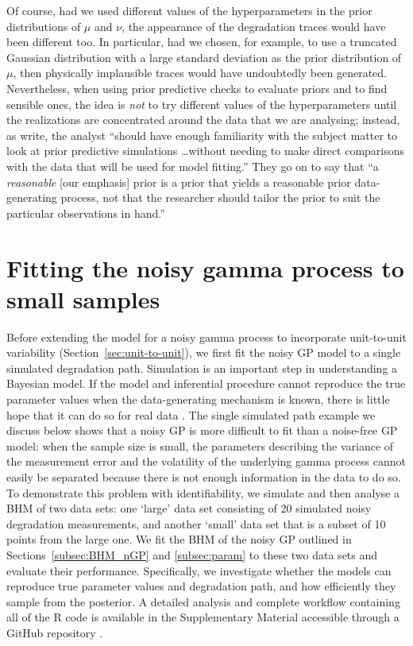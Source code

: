 \documentclass{article}
\begin{document}
Of course, had we used different values of the hyperparameters in the prior distributions of $\mu$ and $\nu$, the appearance of the degradation traces would have been different too. In particular, had we chosen, for example, to use a truncated Gaussian distribution with a large standard deviation as the prior distribution of $\mu$, then physically implausible traces would have undoubtedly been generated. Nevertheless, when using prior predictive checks to evaluate priors and to find sensible ones, the idea is \textit{not} to try different values of the hyperparameters until the realizations are concentrated around the data that we are analysing; instead, as \citet{gabry_vis_2019a} write, the analyst ``should have enough familiarity with the subject matter to look at prior predictive simulations \ldots without needing to make direct comparisons with the data that will be used for model fitting.'' They go on to say that ``a \textit{reasonable} [our emphasis] prior is a prior that yields a reasonable prior data-generating process, not that the researcher should tailor the prior to suit the particular observations in hand.''

\section{Fitting the noisy gamma process to small samples}
\label{sec:noisy_gp}

Before extending the model for a noisy gamma process to incorporate unit-to-unit variability (Section~\ref{sec:unit-to-unit}), we first fit the noisy GP model to a single simulated degradation path. Simulation is an important step in understanding a Bayesian model. If the model and inferential procedure cannot reproduce the true parameter values when the data-generating mechanism is known, there is little hope that it can do so for real data \citep{gelman_bayesian_2020}. The single simulated path example we discuss below shows that a noisy GP is more difficult to fit than a noise-free GP model: when the sample size is small, the parameters describing the variance of the measurement error and the volatility of the underlying gamma process cannot easily be separated because there is not enough information in the data to do so. To demonstrate this problem with identifiability, we simulate and then analyse a BHM of two data sets: one `large' data set consisting of 20 simulated noisy degradation measurements, and another `small' data set that is a subset of 10 points from the large one. We fit the BHM of the noisy GP outlined in Sections~\ref{subsec:BHM_nGP} and \ref{subsec:param} to these two data sets and evaluate their performance. Specifically, we investigate whether the models can reproduce true parameter values and degradation path, and how efficiently they sample from the posterior. A detailed analysis and complete workflow containing all of the R code is available in the Supplementary Material accessible through a GitHub repository \citep{code_repo}.
\end{document}
